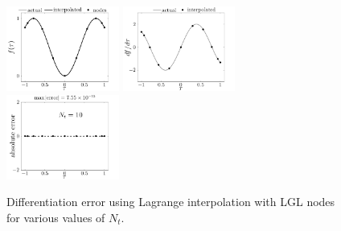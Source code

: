 \begin{figure}
\includegraphics[width=0.33\textwidth, trim=0in 0in 0.5in 0in,clip=true]{../app3/figures/diff-7}%
\includegraphics[width=0.33\textwidth, trim=0in 0in 0.5in 0in,clip=true]{../app3/figures/diff-8}%
\includegraphics[width=0.33\textwidth, trim=0in 0in 0.5in 0in,clip=true]{../app3/figures/diff-9}%

\caption[Differentiation error using Lagrange interpolation with LGL nodes]{Differentiation error using Lagrange interpolation with LGL nodes for various values of $N_t$.\label{fig:diff}}

\end{figure}
